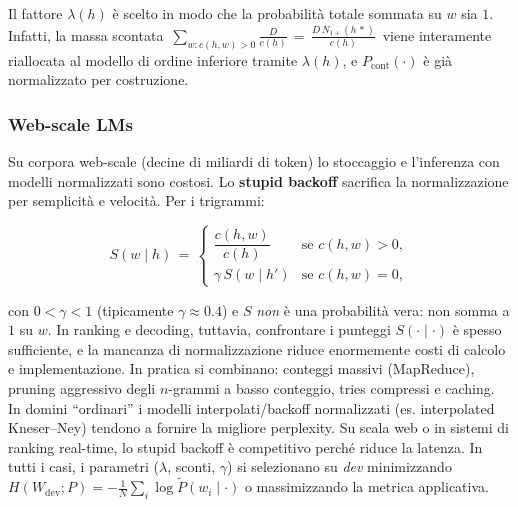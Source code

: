             Il fattore $\lambda(h)$ è scelto in modo che la probabilità totale sommata su $w$ sia $1$. Infatti, la massa scontata \,$\sum_{w:c(h,w)>0} \tfrac{D}{c(h)}\,=\,\tfrac{D\,N_{1+}(h\,\ast)}{c(h)}$\, viene interamente riallocata al modello di ordine inferiore tramite $\lambda(h)$, e $P_{\text{cont}}(\cdot)$ è già normalizzato per costruzione.

        \subsubsection{Web-scale LMs}
        
            Su corpora web-scale (decine di miliardi di token) lo stoccaggio e l’inferenza con modelli normalizzati sono costosi. Lo \textbf{stupid backoff} sacrifica la normalizzazione per semplicità e velocità. Per i trigrammi:
            
            $$
            S(w\mid h) \,=\, \begin{cases}
            \dfrac{c(h,w)}{c(h)} & \text{se } c(h,w)>0,\\[8pt]
            \gamma\, S(w\mid h') & \text{se } c(h,w)=0,
            \end{cases}
            $$
            
            con $0<\gamma<1$ (tipicamente $\gamma\approx 0.4$) e $S$ \textit{non} è una probabilità vera: non somma a $1$ su $w$. In ranking e decoding, tuttavia, confrontare i punteggi $S(\cdot\mid\cdot)$ è spesso sufficiente, e la mancanza di normalizzazione riduce enormemente costi di calcolo e implementazione. In pratica si combinano: conteggi massivi (MapReduce), pruning aggressivo degli $n$-grammi a basso conteggio, tries compressi e caching.\\
            
        \noindent In domini “ordinari” i modelli interpolati/backoff normalizzati (es. interpolated Kneser--Ney) tendono a fornire la migliore perplexity. Su scala web o in sistemi di ranking real-time, lo stupid backoff è competitivo perché riduce la latenza. In tutti i casi, i parametri ($\lambda$, sconti, $\gamma$) si selezionano su \textit{dev} minimizzando $H(W_{\text{dev}};P)=-\tfrac{1}{N}\sum_i\log \tilde P(w_i\mid\cdot)$ o massimizzando la metrica applicativa.
    
    